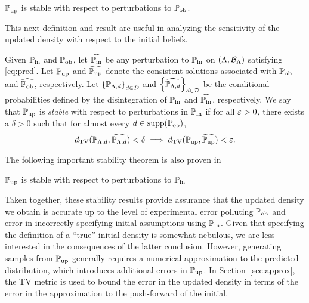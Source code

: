 \begin{thm}
  $\operatorname*{\mathbb{P}_{up}}$ is stable with respect to perturbations to $\operatorname*{\mathbb{P}_{ob}}$.
  \label{thm:stableobs}
\end{thm}

This next definition and result are useful in analyzing the sensitivity of the updated density with respect to the initial beliefs.

\begin{defn}\label{defn:stableinitial}
  Given $\operatorname*{\mathbb{P}_{in}}$ and $\operatorname*{\mathbb{P}_{ob}}$, let $\widehat{\operatorname*{\mathbb{P}_{in}}}$ be any perturbation to $\operatorname*{\mathbb{P}_{in}}$ on $({\Lambda}, \mathcal{B}_{{\Lambda}})$ satisfying \eqref{eq:pred}.
  Let $\operatorname*{\mathbb{P}_{up}}$ and $\widehat{\operatorname*{\mathbb{P}_{up}}}$ denote the consistent solutions associated with $\operatorname*{\mathbb{P}_{ob}}$ and $\widehat{\operatorname*{\mathbb{P}_{ob}}}$, respectively.
  Let $\left\{\mathbb{P}_{{\Lambda}, d}\right\}_{d\in\mathcal{D}}^{}$ and $\left\{\widehat{\mathbb{P}_{{\Lambda}, d}}\right\}_{d\in\mathcal{D}}^{}$ be the conditional probabilities defined by the disintegration of $\operatorname*{\mathbb{P}_{in}}$ and $\widehat{\operatorname*{\mathbb{P}_{in}}}$, respectively.
  We say that $\operatorname*{\mathbb{P}_{up}}$ is \emph{stable} with respect to perturbations in $\operatorname*{\mathbb{P}_{in}}$ if for all $\varepsilon > 0$, there exists a $\delta > 0$ such that for almost every $d\in\text{supp}(\operatorname*{\mathbb{P}_{ob}})$,
  \begin{equation}\label{eq:stableinitial}
    d_{\text{TV}} (\mathbb{P}_{{\Lambda}, d}, \widehat{\mathbb{P}_{{\Lambda}, d}}) < \delta \implies d_{\text{TV}} (\operatorname*{\mathbb{P}_{up}}, \widehat{\operatorname*{\mathbb{P}_{up}}}) < \varepsilon.
  \end{equation}
\end{defn}

The following important stability theorem is also proven in \cite{BJW18}

\begin{thm}
  $\operatorname*{\mathbb{P}_{up}}$ is stable with respect to perturbations to $\operatorname*{\mathbb{P}_{in}}$
  \label{thm:stableinitial}
\end{thm}

Taken together, these stability results provide assurance that the updated density we obtain is accurate up to the level of experimental error polluting $\operatorname*{\mathbb{P}_{ob}}$ and error in incorrectly specifying initial assumptions using $\operatorname*{\mathbb{P}_{in}}$.
Given that specifying the definition of a ``true'' initial density is somewhat nebulous, we are less interested in the consequences of the latter conclusion.
However, generating samples from $\operatorname*{\mathbb{P}_{up}}$ generally requires a numerical approximation to the predicted distribution, which introduces additional errors in $\operatorname*{\mathbb{P}_{up}}$.
In Section~\ref{sec:approx}, the TV metric is used to bound the error in the updated density in terms of the error in the approximation to the push-forward of the initial.




